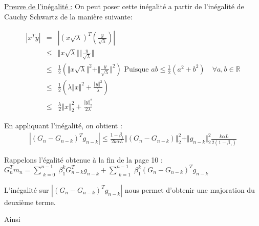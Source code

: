 \documentclass{article}
\begin{document}
\bigskip

\underline{Preuve de l'inégalité :} On peut poser cette inégalité a partir de l'inégalité de Cauchy Schwartz de la manière suivante:

\bigskip

\begin{eqnarray*}
    |x^T y | &=& | (x \sqrt{\lambda})^T( \frac{y}{\sqrt{\lambda}})| \\
    &\leq& \Vert x \sqrt{\lambda} \Vert \Vert \frac{y}{\sqrt{\lambda} } \Vert \\
    &\leq& \frac{1}{2} \left ( \Vert x \sqrt{\lambda}  \Vert^2  + \Vert \frac{y}{\sqrt{\lambda} } \Vert^2 \right ) \textrm{ Puisque $ab \leq \frac{1}{2} (a^2+b^2) \quad  \forall a,b \in \mathbb{R}$} \\
    &\leq& \frac{1}{2} \left ( \lambda \Vert x  \Vert^2  +  \frac{\Vert y \Vert^2}{\lambda }  \right ) \\
    &\leq& \frac{\lambda}{2}  \Vert x \Vert ^2_2 + \frac{ \Vert y \Vert _2^2}{2 \lambda}
\end{eqnarray*}




\bigskip

En appliquant l'inégalité, on obtient :
\begin{eqnarray*}
     |(G_n-G_{n-k})^T g_{n-k} | \leq \frac{1-\beta_1}{2 k \alpha L}  \Vert (G_n-G_{n-k}) \Vert _2^2+  \Vert g_{n-k}  \Vert _2^2 \frac{k \alpha L}{2 (1-\beta_1)}
\end{eqnarray*}

\bigskip

Rappelons l'égalité obtenue à la fin de la page 10 : $G^T_n m_n= \sum\limits_{\substack {k=0}}^{n-1} \beta_1^k G_{n-k}^T g_{n-k}+ \sum\limits_{\substack {k=1}}^{n-1} \beta_1^k (G_n- G_{n-k})^T g_{n-k}$


\bigskip

L'inégalité sur $ | (G_n-G_{n-k})^T g_{n-k} |$ nous permet d'obtenir une majoration du deuxième terme.

\bigskip


\bigskip

Ainsi
\end{document}
